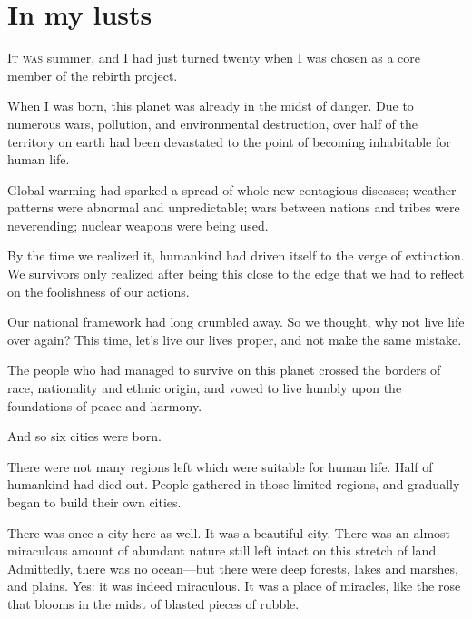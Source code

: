 
\chapter{In my lusts}


\lettrine[ante=``]{I}{t was} summer, and I had just turned twenty when I was chosen as a core
member of the rebirth project.

When I was born, this planet was already in the midst of danger. Due to
numerous wars, pollution, and environmental destruction, over half of
the territory on earth had been devastated to the point of becoming
inhabitable for human life.

Global warming had sparked a spread of whole new contagious diseases;
weather patterns were abnormal and unpredictable; wars between nations
and tribes were neverending; nuclear weapons were being used.

By the time we realized it, humankind had driven itself to the verge of
extinction. We survivors only realized after being this close to the
edge that we had to reflect on the foolishness of our actions.

Our national framework had long crumbled away. So we thought, why not
live life over again? This time, let's live our lives proper, and not
make the same mistake.

The people who had managed to survive on this planet crossed the borders
of race, nationality and ethnic origin, and vowed to live humbly upon
the foundations of peace and harmony.

And so six cities were born.

There were not many regions left which were suitable for human life.
Half of humankind had died out. People gathered in those limited
regions, and gradually began to build their own cities.

There was once a city here as well. It was a beautiful city. There was
an almost miraculous amount of abundant nature still left intact on this
stretch of land. Admittedly, there was no ocean---but there were deep
forests, lakes and marshes, and plains. Yes: it was indeed miraculous.
It was a place of miracles, like the rose that blooms in the midst of
blasted pieces of rubble.

